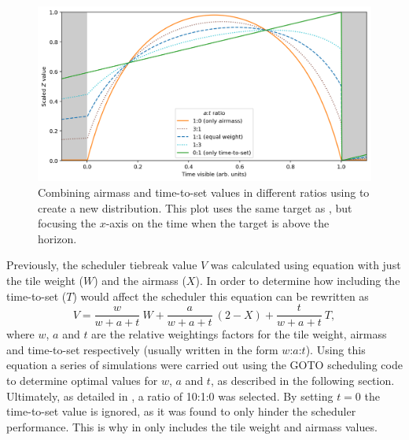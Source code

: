 \begin{colsection}
\begin{figure}[t]
    \begin{center}
        \includegraphics[width=\linewidth]{images/at_ratio.png}
    \end{center}
    \caption[Combining airmass and time-to-set values]{
        Combining airmass and time-to-set values in different ratios using  to create a new distribution. This plot uses the same target as , but focusing the $x$-axis on the time when the target is above the horizon.
    }\label{fig:at_ratio}
\end{figure}

\newpage

Previously, the scheduler tiebreak value $V$ was calculated using equation  with just the tile weight ($W$) and the airmass ($X$). In order to determine how including the time-to-set ($T$) would affect the scheduler this equation can be rewritten as
%
\begin{equation}
    V = \frac{w}{w+a+t}~W + \frac{a}{w+a+t}~(2-X) + \frac{t}{w+a+t}~T,
    \label{eq:wat}
\end{equation}
%
where $w$, $a$ and $t$ are the relative weightings factors for the tile weight, airmass and time-to-set respectively (usually written in the form $w$:$a$:$t$). Using this equation a series of simulations were carried out using the GOTO scheduling code to determine optimal values for $w$, $a$ and $t$, as described in the following section. Ultimately, as detailed in , a ratio of 10:1:0 was selected. By setting $t=0$ the time-to-set value is ignored, as it was found to only hinder the scheduler performance. This is why  in  only includes the tile weight and airmass values.

\end{colsection}


